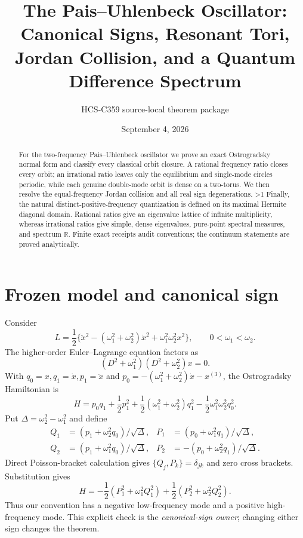 \documentclass[10pt]{article}
\title{The Pais--Uhlenbeck Oscillator: Canonical Signs, Resonant Tori,\\
Jordan Collision, and a Quantum Difference Spectrum}
\author{HCS-C359 source-local theorem package}
\date{September 4, 2026}
\providecommand{\CRevisionRound}{2}
\newcommand{\R}{\mathbb R}
\begin{document}
\maketitle

\begin{abstract}
For the two-frequency Pais--Uhlenbeck oscillator we prove an exact
Ostrogradsky normal form and classify every classical orbit closure.  A
rational frequency ratio closes every orbit; an irrational ratio leaves only
the equilibrium and single-mode circles periodic, while each genuine
double-mode orbit is dense on a two-torus.  We then resolve the
equal-frequency Jordan collision and all real sign degenerations.
\ifnum\CRevisionRound>1
Finally, the natural distinct-positive-frequency quantization is defined on
its maximal Hermite diagonal domain.  Rational ratios give an eigenvalue
lattice of infinite multiplicity, whereas irrational ratios give simple,
dense eigenvalues, pure-point spectral measures, and spectrum \(\R\).
\fi
Finite exact receipts audit conventions; the continuum statements are proved
analytically.
\end{abstract}

\section{Frozen model and canonical sign}
Consider
\begin{equation}
 L=\frac12\{\ddot x^2-(\omega _1^2+\omega _2^2)\dot x^2
 +\omega _1^2\omega _2^2x^2\},\qquad 0<\omega _1<\omega _2.
\end{equation}
The higher-order Euler--Lagrange equation factors as
\begin{equation}
 (D^2+\omega _1^2)(D^2+\omega _2^2)x=0.
\end{equation}
With \(q_0=x,q_1=\dot x,p_1=\ddot x\) and
\(p_0=-(\omega _1^2+\omega _2^2)\dot x-x^{(3)}\), the Ostrogradsky
Hamiltonian is
\begin{equation}
 H=p_0q_1+\frac12p_1^2+\frac12(\omega _1^2+\omega _2^2)q_1^2
 -\frac12\omega _1^2\omega _2^2q_0^2.
\end{equation}
Put \(\Delta=\omega _2^2-\omega _1^2\) and define
\begin{align}
 Q_1&=(p_1+\omega _2^2q_0)/\sqrt\Delta,&
 P_1&=(p_0+\omega _1^2q_1)/\sqrt\Delta,\nonumber\\
 Q_2&=(p_1+\omega _1^2q_0)/\sqrt\Delta,&
 P_2&=-(p_0+\omega _2^2q_1)/\sqrt\Delta.
\end{align}
Direct Poisson-bracket calculation gives
\(\{Q_j,P_k\}=\delta_{jk}\) and zero cross brackets.  Substitution gives
\begin{equation}
 H=-\frac12(P_1^2+\omega _1^2Q_1^2)
 +\frac12(P_2^2+\omega _2^2Q_2^2).
\end{equation}
Thus our convention has a negative low-frequency mode and a positive
high-frequency mode.  This explicit check is the \emph{canonical-sign owner};
changing either sign changes the theorem.
\end{document}
